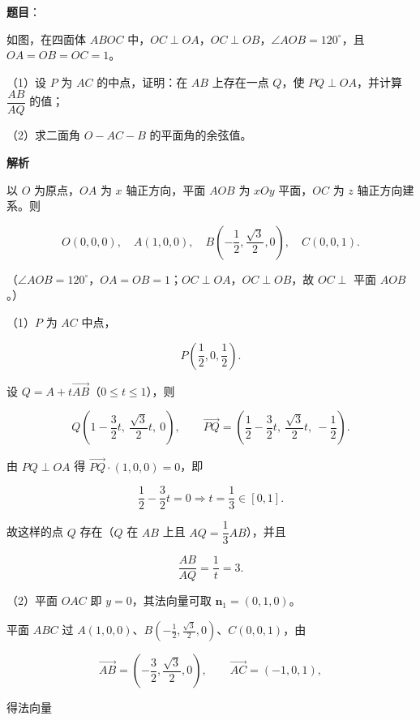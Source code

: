 \begin{answer}

\textbf{题目}：

如图，在四面体 $ABOC$ 中，$OC\perp OA$，$OC\perp OB$，$\angle AOB=120^\circ$，且 $OA=OB=OC=1$。

（1）设 $P$ 为 $AC$ 的中点，证明：在 $AB$ 上存在一点 $Q$，使 $PQ\perp OA$，并计算 $\dfrac{AB}{AQ}$ 的值；

（2）求二面角 $O-AC-B$ 的平面角的余弦值。
\nopagebreak[4]
\begin{center}\end{center}
\nopagebreak[4]
\textbf{解析}

以 $O$ 为原点，$OA$ 为 $x$ 轴正方向，平面 $AOB$ 为 $xOy$ 平面，$OC$ 为 $z$ 轴正方向建系。则

\nopagebreak[4]
\[O(0,0,0),\quad A(1,0,0),\quad B\left(-\frac12,\frac{\sqrt3}{2},0\right),\quad C(0,0,1).\]

（$\angle AOB=120^\circ$，$OA=OB=1$；$OC\perp OA$，$OC\perp OB$，故 $OC\perp$ 平面 $AOB$。）

（1）$P$ 为 $AC$ 中点，

\nopagebreak[4]
\[P\left(\frac12,0,\frac12\right).\]

设 $Q=A+t\overrightarrow{AB}$（$0\leqslant t\leqslant1$），则

\nopagebreak[4]
\[Q\left(1-\frac32t,\ \frac{\sqrt3}{2}t,\ 0\right),\qquad
\overrightarrow{PQ}=\left(\frac12-\frac32t,\ \frac{\sqrt3}{2}t,\ -\frac12\right).\]

由 $PQ\perp OA$ 得 $\overrightarrow{PQ}\cdot(1,0,0)=0$，即

\nopagebreak[4]
\[\frac12-\frac32t=0\Longrightarrow t=\frac13\in[0,1].\]

故这样的点 $Q$ 存在（$Q$ 在 $AB$ 上且 $AQ=\dfrac13AB$），并且

\nopagebreak[4]
\[\frac{AB}{AQ}=\frac{1}{t}=3.\]

（2）平面 $OAC$ 即 $y=0$，其法向量可取 $\boldsymbol n_1=(0,1,0)$。

平面 $ABC$ 过 $A(1,0,0)$、$B\left(-\frac12,\frac{\sqrt3}{2},0\right)$、$C(0,0,1)$，由

\nopagebreak[4]
\[\overrightarrow{AB}=\left(-\frac32,\frac{\sqrt3}{2},0\right),\qquad \overrightarrow{AC}=(-1,0,1),\]

得法向量


\end{answer}
